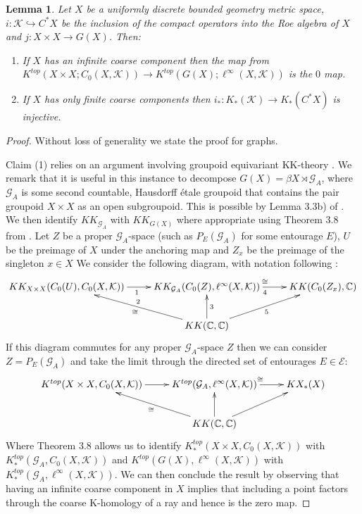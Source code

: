\documentclass[preprint]{elsarticle}
\theoremstyle{plain}
\newtheorem{lemma}[theorem]{Lemma}%
\theoremstyle{definition}%
\theoremstyle{remark}%
\newcommand{\G}{\mathcal{G}}
\begin{document}
\begin{lemma}\label{lem:zandi}
Let $X$ be a uniformly discrete bounded geometry metric space, $i: \mathcal{K} \hookrightarrow C^{*}X$ be the inclusion of the compact operators into the Roe algebra of $X$ and $j:X\times X \rightarrow G(X)$. Then:
\begin{enumerate}
\item If $X$ has an infinite coarse component then the map from $K^{top}(X \times X; C_{0}(X,\mathcal{K})) \rightarrow K^{top}(G(X); \ell^{\infty}(X,\mathcal{K}))$ is the $0$ map.
\item If $X$ has only finite coarse components then $i_{*}:K_{*}(\mathcal{K}) \rightarrow K_{*}(C^{*}X)$ is injective.
\end{enumerate}
\end{lemma}
\begin{proof}
Without loss of generality we state the proof for graphs. 

Claim (1) relies on an argument involving groupoid equivariant KK-theory \cite{MR1656031,MR1686846,MR1798599}. We remark that it is useful in this instance to decompose $G(X)=\beta X \rtimes \G_{A}$, where $\G_{A}$ is some second countable, Hausdorff \'etale groupoid that contains the pair groupoid $X \times X$ as an open subgroupoid. This is possible by Lemma 3.3b) of \cite{MR1905840}. We then identify $KK_{\G_{A}}$ with $KK_{G(X)}$ where appropriate using Theorem 3.8 from \cite{cbcag2}. Let $Z$ be a proper $\G_{A}$-space (such as $P_{E}(\G_{A})$ for some entourage $E$), $U$ be the preimage of $X$ under the anchoring map and $Z_{x}$ be the preimage of the singleton $x \in X$ We consider the following diagram, with notation following \cite{MR1905840,MR1656031}:
\begin{equation*}
\xymatrix{KK_{X\times X}(C_{0}(U),C_{0}(X,\mathcal{K})) \ar[r]_{1} & KK_{\G_{A}}(C_{0}(Z),\ell^{\infty}(X,\mathcal{K})) \ar[r]^{\cong}_{4}  & KK(C_{0}(Z_{x}),\mathbb{C}) \\
& KK(\mathbb{C},\mathbb{C}) \ar^{\cong}_{2}[lu]\ar[u]_{3}\ar[ur]_{5}&
}
\end{equation*}
If this diagram commutes for any proper $\G_{A}$-space $Z$ then we can consider $Z = P_{E}(\G_{A})$ and take the limit through the directed set of entourages $E \in \mathcal{E}$:
\begin{equation*}
\xymatrix{K^{top}(X \times X, C_{0}(X,\mathcal{K})) \ar[r] & K^{top}(\G_{A},\ell^{\infty}(X,\mathcal{K})) \ar[r]^{\cong}  & KX_{*}(X) \\
& KK(\mathbb{C},\mathbb{C}) \ar^{\cong}[lu]\ar[u]\ar[ur]&
}
\end{equation*}
Where Theorem 3.8 \cite{cbcag2} allows us to identify $K^{top}_{*}(X\times X , C_{0}(X,\mathcal{K}))$ with $K^{top}_{*}(\G_{A}, C_{0}(X,\mathcal{K}))$ and $K^{top}(G(X), \ell^{\infty}(X,\mathcal{K}))$ with $K^{top}_{*}(\G_{A},\ell^{\infty}(X,\mathcal{K}))$. We can then conclude the result by observing that having an infinite coarse component in $X$ implies that including a point factors through the coarse K-homology of a ray and hence is the zero map.


\end{proof}
\end{document}
